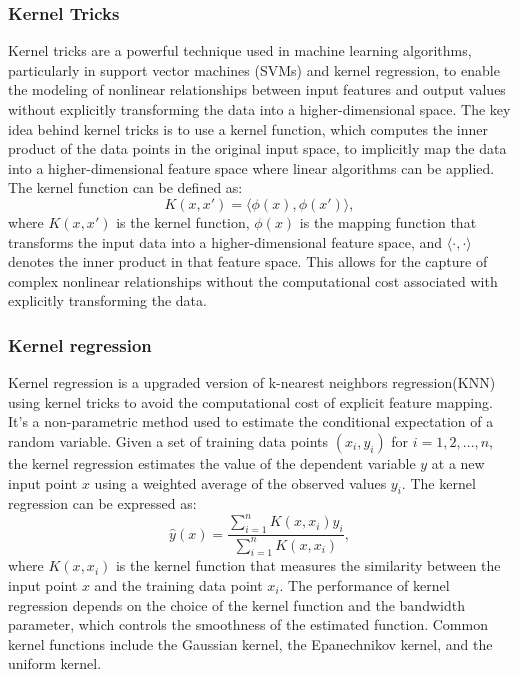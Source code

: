 \documentclass{article}
\begin{document}
\subsubsection{Kernel Tricks}
Kernel tricks are a powerful technique used in machine learning algorithms, particularly in support vector machines (SVMs) and kernel regression, to enable the modeling of nonlinear relationships between input features and output values without explicitly transforming the data into a higher-dimensional space.
The key idea behind kernel tricks is to use a kernel function, which computes the inner product of the data points in the original input space, to implicitly map the data into a higher-dimensional feature space where linear algorithms can be applied.
The kernel function can be defined as:
\begin{equation}
    K(x, x') = \langle \phi(x), \phi(x') \rangle,
\end{equation}
where $K(x, x')$ is the kernel function, $\phi(x)$ is the mapping function that transforms the input data into a higher-dimensional feature space, and $\langle \cdot, \cdot \rangle$ denotes the inner product in that feature space.
This allows for the capture of complex nonlinear relationships without the computational cost associated with explicitly transforming the data.

\subsubsection{Kernel regression}
Kernel regression is a upgraded version of k-nearest neighbors regression(KNN) using kernel tricks to avoid the computational cost of explicit feature mapping.
It's a non-parametric method used to estimate the conditional expectation of a random variable.
Given a set of training data points $(x_i, y_i)$ for $i = 1, 2, \ldots, n$,
the kernel regression estimates the value of the dependent variable $y$ at a new input point $x$ using a weighted average of the observed values $y_i$.
The kernel regression can be expressed as:
\begin{equation}
    \hat{y}(x) = \frac{\sum_{i=1}^{n} K(x, x_i) y_i}{\sum_{i=1}^{n} K(x, x_i)},
\end{equation}
where $K(x, x_i)$ is the kernel function that measures the similarity between the input point $x$ and the training data point $x_i$.
The performance of kernel regression depends on the choice of the kernel function and the bandwidth parameter, which controls the smoothness of the estimated function.
Common kernel functions include the Gaussian kernel, the Epanechnikov kernel, and the uniform kernel.
\end{document}
